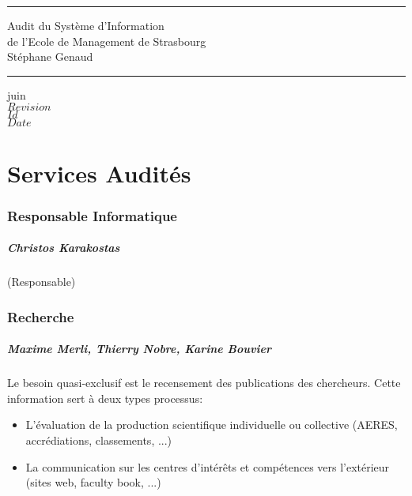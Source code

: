 \documentclass{book}
\begin{document}
\newcommand{\motcle}[1]{\index{#1}\emph{#1}}
\newcommand{\instrcle}[1]{\index{\texttt{#1}}\texttt{#1}}

\thispagestyle{empty}
\rhead[]{}
\pagestyle{fancy}
\setlength{\parindent}{0mm}
\setlength{\parskip}{0mm}
\rule{\linewidth}{1mm}
\begin{center}
\Large{Audit du Système d'Information}\\[5mm]
\Large{de l'Ecole de Management de Strasbourg}\\[5mm]
\large{Stéphane Genaud}
\rule{\linewidth}{1mm}
\end{center}
\begin{center}
juin  \\
\textrm{
$Revision$\\
$Id$\\
$Date$\\
}
\end{center}

\tableofcontents
\newpage

 
 

\chapter{Services Audités}
 

\subsection{Responsable Informatique}

\paragraph{Christos Karakostas} (Responsable)


\subsection{Recherche}
\paragraph{Maxime Merli, Thierry Nobre, Karine Bouvier}

Le besoin quasi-exclusif est le recensement des publications des chercheurs.
Cette information sert à deux types processus:
\begin{itemize}
\item L'évaluation de la production scientifique individuelle ou collective (AERES, accrédiations, classements, ...)
\item La communication sur les centres d'intérêts et compétences vers l'extérieur (sites web, faculty book, ...)
\end{itemize}
\end{document}
